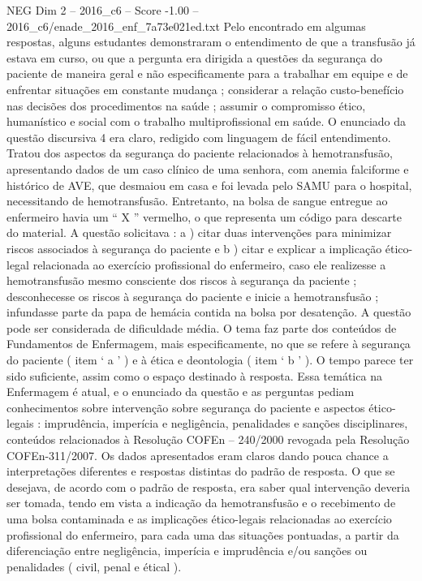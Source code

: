 \begin{textsample}{NEG Dim 2 – 2016\_c6 – Score -1.00 – 2016\_c6/enade\_2016\_enf\_7a73e021ed.txt}
Pelo encontrado em algumas respostas, alguns estudantes demonstraram o entendimento de que a transfusão já estava em curso, ou que a pergunta era dirigida a questões da segurança do paciente de maneira geral e não especificamente para a trabalhar em equipe e de enfrentar situações em constante mudança ; considerar a relação custo-benefício nas decisões dos procedimentos na saúde ; assumir o compromisso ético, humanístico e social com o trabalho multiprofissional em saúde.
O enunciado da questão discursiva 4 era claro, redigido com linguagem de fácil entendimento.
Tratou dos aspectos da segurança do paciente relacionados à hemotransfusão, apresentando dados de um caso clínico de uma senhora, com anemia falciforme e histórico de AVE, que desmaiou em casa e foi levada pelo SAMU para o hospital, necessitando de hemotransfusão.
Entretanto, na bolsa de sangue entregue ao enfermeiro havia um “ X ” vermelho, o que representa um código para descarte do material.
A questão solicitava : a ) citar duas intervenções para minimizar riscos associados à segurança do paciente e b ) citar e explicar a implicação ético-legal relacionada ao exercício profissional do enfermeiro, caso ele realizesse a hemotransfusão mesmo consciente dos riscos à segurança da paciente ; desconhecesse os riscos à segurança do paciente e inicie a hemotransfusão ; infundasse parte da papa de hemácia contida na bolsa por desatenção.
A questão pode ser considerada de dificuldade média.
O tema faz parte dos conteúdos de Fundamentos de Enfermagem, mais especificamente, no que se refere à segurança do paciente ( item ‘ a ’ ) e à ética e deontologia ( item ‘ b ’ ).
O tempo parece ter sido suficiente, assim como o espaço destinado à resposta.
Essa temática na Enfermagem é atual, e o enunciado da questão e as perguntas pediam conhecimentos sobre intervenção sobre segurança do paciente e aspectos ético-legais : imprudência, imperícia e negligência, penalidades e sanções disciplinares, conteúdos relacionados à Resolução COFEn – 240/2000 revogada pela Resolução COFEn-311/2007.
Os dados apresentados eram claros dando pouca chance a interpretações diferentes e respostas distintas do padrão de resposta.
O que se desejava, de acordo com o padrão de resposta, era saber qual intervenção deveria ser tomada, tendo em vista a indicação da hemotransfusão e o recebimento de uma bolsa contaminada e as implicações ético-legais relacionadas ao exercício profissional do enfermeiro, para cada uma das situações pontuadas, a partir da diferenciação entre negligência, imperícia e imprudência e/ou sanções ou penalidades ( civil, penal e étical ).

\end{textsample}
